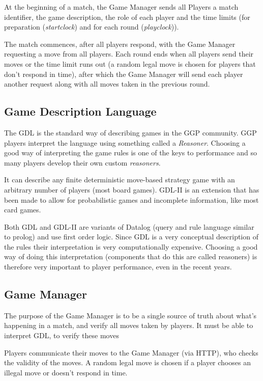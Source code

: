 At the beginning of a match, the Game Manager sends all Players a match identifier, the game description, the role of each player and the time limits (for preparation (\textit{startclock}) and for each round (\textit{playclock})).

The match commences, after all players respond, with the Game Manager requesting a move from all players. Each round ends when all players send their moves or the time limit runs out (a random legal move is chosen for players that don't respond in time), after which the Game Manager will send each player another request along with all moves taken in the previous round.


\subsection{Game Description Language}
The \gls{GDL} is the standard way of describing games in the \gls{GGP} community.
\gls{GGP} players interpret the language using something called a \textit{Reasoner}. Choosing a good way of interpreting the game rules is one of the keys to performance and so many players develop their own custom \textit{reasoners}.

It can describe any finite deterministic move-based strategy game with an arbitrary number of players (most board games). GDL-II is an extension that has been made to allow for probabilistic games and incomplete information, like most card games.

Both GDL and GDL-II are variants of Datalog (query and rule language similar to prolog) and use first order logic.
Since GDL is a very conceptual description of the rules their interpretation is very computationally expensive. Choosing a good way of doing this interpretation (components that do this are called reasoners) is therefore very important to player performance, even in the recent years.

\subsection{Game Manager}
The purpose of the Game Manager is to be a single source of truth about what's happening in a match, and verify all moves taken by players. It must be able to interpret \gls{GDL}, to verify these moves

Players communicate their moves to the Game Manager (via HTTP), who checks the validity of the moves. A random legal move is chosen if a player chooses an illegal move or doesn't respond in time.

